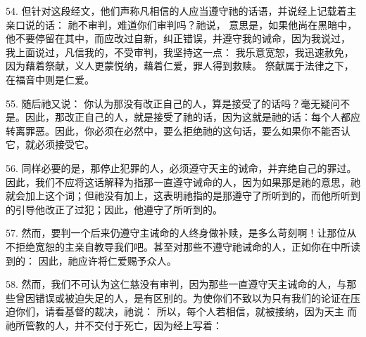 54. 但针对这段经文，他们声称凡相信的人应当遵守祂的话语，并说经上记载着主亲口说的话： 祂不审判，难道你们审判吗？祂说， 意思是，如果他尚在黑暗中，他不要停留在其中，而应改过自新，纠正错误，并遵守我的诫命，因为我说过，  我上面说过，凡信我的，不受审判，我坚持这一点：  我乐意宽恕，我迅速赦免，  因为藉着祭献，义人更蒙悦纳，藉着仁爱，罪人得到救赎。  祭献属于法律之下，在福音中则是仁爱。 \par

55. 随后祂又说：  你认为那没有改正自己的人，算是接受了的话吗？毫无疑问不是。因此，那改正自己的人，就是接受了祂的话，因为这就是祂的话：每个人都应转离罪恶。因此，你必须在必然中，要么拒绝祂的这句话，要么如果你不能否认它，就必须接受它。\par

56. 同样必要的是，那停止犯罪的人，必须遵守天主的诫命，并弃绝自己的罪过。因此，我们不应将这话解释为指那一直遵守诫命的人，因为如果那是祂的意思，祂就会加上这个词；但祂没有加上，这表明祂指的是那遵守了所听到的，而他所听到的引导他改正了过犯；因此，他遵守了所听到的。\par

57. 然而，要判一个后来仍遵守主诫命的人终身做补赎，是多么苛刻啊！让那位从不拒绝宽恕的主亲自教导我们吧。甚至对那些不遵守祂诫命的人，正如你在中所读到的： 因此，祂应许将仁爱赐予众人。\par

58. 然而，我们不可认为这仁慈没有审判，因为那些一直遵守天主诫命的人，与那些曾因错误或被迫失足的人，是有区别的。为使你们不致以为只有我们的论证在压迫你们，请看基督的裁决，祂说： 所以，每个人若相信，就被接纳，因为天主 而祂所管教的人，并不交付于死亡，因为经上写着：\par

